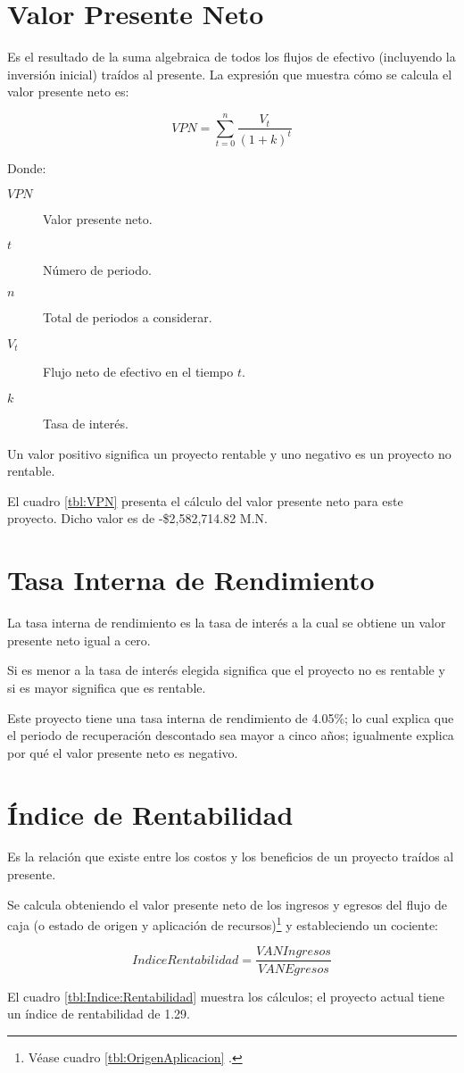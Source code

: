 \section{Valor Presente Neto}

Es el resultado de la suma algebraica de todos los flujos de efectivo (incluyendo la inversión inicial) traídos al presente. La expresión que muestra cómo se calcula el valor presente neto es:

$$VPN = \sum_{t=0}^{n}{\frac{V_t}{\left(1+k\right)^t}}$$

Donde:

\begin{description}
	\item[$VPN$] Valor presente neto.
	\item[$t$] Número de periodo.
	\item[$n$] Total de periodos a considerar.
	\item[$V_t$] Flujo neto de efectivo en el tiempo $t$.
	\item[$k$] Tasa de interés.
\end{description}

Un valor positivo significa un proyecto rentable y uno negativo es un proyecto no rentable.

El cuadro \ref{tbl:VPN} presenta el cálculo del valor presente neto para este proyecto. Dicho valor es de -\$2,582,714.82 M.N.



\section{Tasa Interna de Rendimiento}

La tasa interna de rendimiento es la tasa de interés a la cual se obtiene un valor presente neto igual a cero.

Si es menor a la tasa de interés elegida significa que el proyecto no es rentable y si es mayor significa que es rentable.

Este proyecto tiene una tasa interna de rendimiento de 4.05\%; lo cual explica que el periodo de recuperación descontado sea mayor a cinco años; igualmente explica por qué el valor presente neto es negativo.

\section{Índice de Rentabilidad}

Es la relación que existe entre los costos y los beneficios de un proyecto traídos al presente.

Se calcula obteniendo el valor presente neto de los ingresos y egresos del flujo de caja (o estado de origen y aplicación de recursos)\footnote{Véase cuadro \ref{tbl:OrigenAplicacion} \pageref{tbl:OrigenAplicacion}.} y estableciendo un cociente:

$$Indice Rentabilidad = \frac{VAN Ingresos}{VAN Egresos} $$

El cuadro \ref{tbl:Indice:Rentabilidad} muestra los cálculos; el proyecto actual tiene un índice de rentabilidad de 1.29.


